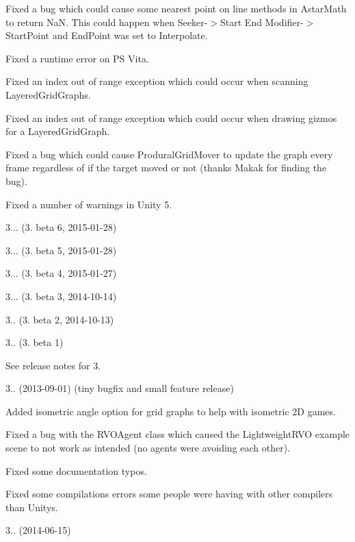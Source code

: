 \begin{DoxyItemize}
\begin{DoxyItemize}
\begin{DoxyItemize}
\item Fixed a bug which could cause some nearest point on line methods in Astar\+Math to return NaN. This could happen when Seeker-\/$>$Start End Modifier-\/$>$Start\+Point and End\+Point was set to Interpolate.
\item Fixed a runtime error on PS Vita.
\item Fixed an index out of range exception which could occur when scanning Layered\+Grid\+Graphs.
\item Fixed an index out of range exception which could occur when drawing gizmos for a Layered\+Grid\+Graph.
\item Fixed a bug which could cause Produral\+Grid\+Mover to update the graph every frame regardless of if the target moved or not (thanks Makak for finding the bug).
\item Fixed a number of warnings in Unity 5.
\end{DoxyItemize}
\end{DoxyItemize}
\item 3... (3. beta 6, 2015-\/01-\/28)
\item 3... (3. beta 5, 2015-\/01-\/28)
\item 3... (3. beta 4, 2015-\/01-\/27)
\item 3... (3. beta 3, 2014-\/10-\/14)
\item 3.. (3. beta 2, 2014-\/10-\/13)
\item 3.. (3. beta 1)
\begin{DoxyItemize}
\item See release notes for 3.
\end{DoxyItemize}
\item 3.. (2013-\/09-\/01) (tiny bugfix and small feature release)
\begin{DoxyItemize}
\item Added isometric angle option for grid graphs to help with isometric 2D games.
\item Fixed a bug with the R\+V\+O\+Agent class which caused the Lightweight\+R\+VO example scene to not work as intended (no agents were avoiding each other).
\item Fixed some documentation typos.
\item Fixed some compilations errors some people were having with other compilers than Unity\textquotesingle{}s.
\end{DoxyItemize}
\item 3.. (2014-\/06-\/15)

\end{DoxyItemize}
